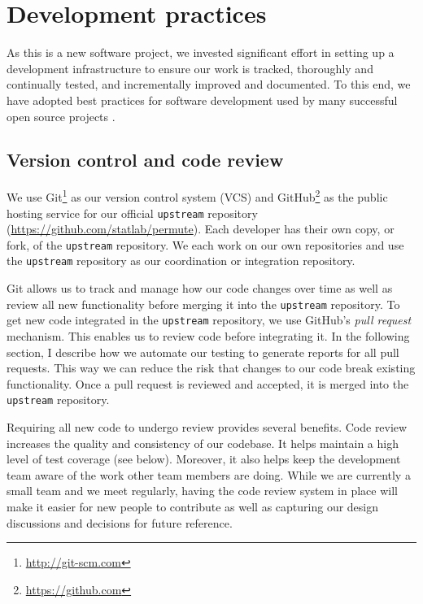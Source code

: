 \chapter{\label{ch:dev}Development practices}

As this is a new software project, we invested significant effort in setting
up a development infrastructure to ensure our work is tracked,
thoroughly and continually tested, and incrementally improved and documented.
To this end, we have adopted best practices for software development used by
many successful open source projects \cite{millman2014}.

\section{\label{sec:vc}Version control and code review}

We use Git\footnote{\url{http://git-scm.com}} as our version control system
(VCS) and GitHub\footnote{\url{https://github.com}} as the public hosting
service for our official \texttt{upstream} repository
(\url{https://github.com/statlab/permute}).  Each developer has their own copy,
or fork, of the \texttt{upstream} repository.  We each work on our own
repositories and use the \texttt{upstream} repository as our coordination or
integration repository.

Git allows us to track and manage how our code changes over time as well as
review all new functionality before merging it into the \texttt{upstream}
repository.  To get new code integrated in the \texttt{upstream} repository, we
use GitHub's \emph{pull request} mechanism.  This enables us to review code
before integrating it.  In the following section, I describe how we automate
our testing to generate reports for all pull requests.  This way we can reduce
the risk that changes to our code break existing functionality.  Once a pull
request is reviewed and accepted, it is merged into the \texttt{upstream}
repository.

Requiring all new code to undergo review provides several benefits.  Code
review increases the quality and consistency of our codebase.  It helps
maintain a high level of test coverage (see below).  Moreover, it also
helps keep the development team aware of the work other team members are
doing.  While we are currently a small team and we meet regularly, having
the code review system in place will make it easier for new people to
contribute as well as capturing our design discussions and decisions for
future reference.

